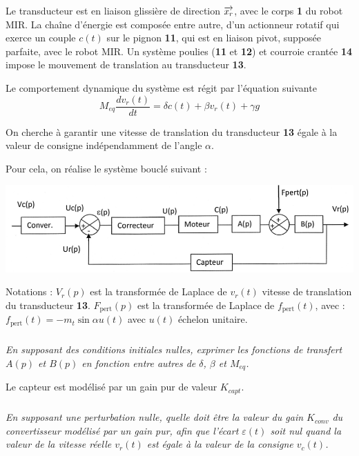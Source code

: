 \documentclass[10pt,fleqn]{article} %
\begin{document}
Le transducteur est en liaison glissière de direction $\overrightarrow{x_r}$, avec le corps \textbf{1} du robot MIR. La chaîne d’énergie est composée entre autre, d’un actionneur rotatif qui exerce un couple $c(t)$ sur le pignon \textbf{11}, qui est en liaison pivot, supposée parfaite, avec le robot MIR.
Un système poulies (\textbf{11} et \textbf{12}) et courroie crantée \textbf{14} impose le mouvement de translation au transducteur \textbf{13}.
 
 Le comportement dynamique du système est régit par l'équation suivante  
 $$
 M_{eq}\dfrac{dv_r(t)}{dt}=\delta c(t) + \beta v_r(t) + \gamma g
 $$

On cherche à garantir une vitesse de translation du transducteur \textbf{13} égale à la valeur de consigne indépendamment de l’angle $\alpha$.

Pour cela, on réalise le système bouclé suivant :

\begin{center}
	\includegraphics[width=\linewidth]{images/fig_13}
\end{center}

Notations : $V_r(p)$ est la transformée de Laplace de $v_r(t)$ vitesse de translation du transducteur \textbf{13}.
$F_{\text{pert}}(p)$ est la transformée de Laplace de $f_{\text{pert}}(t)$, avec :
$f_{\text{pert}}(t) = -m_t  \sin \alpha u(t)$ avec $u(t)$ échelon unitaire.


\subparagraph{}
\textit{En supposant des conditions initiales nulles, exprimer les fonctions de transfert $A(p)$ et $B(p)$ en fonction entre autres de $\delta$, $\beta$ et $M_{eq}$.
}
\ifprof
\begin{corrige}
\end{corrige}
\else
\fi

\vspace{.25cm}
Le capteur est modélisé par un gain pur de valeur $K_{capt}$.


\subparagraph{}
\textit{En supposant une perturbation nulle, quelle doit être la valeur du gain $K_{conv}$ du convertisseur modélisé par un gain pur, afin que l’écart $\varepsilon(t)$ soit nul quand la valeur de la vitesse réelle $v_r(t)$ est égale à la valeur de la consigne $v_c(t)$. 
}
\ifprof
\begin{corrige}
\end{corrige}
\else
\fi
\end{document}
